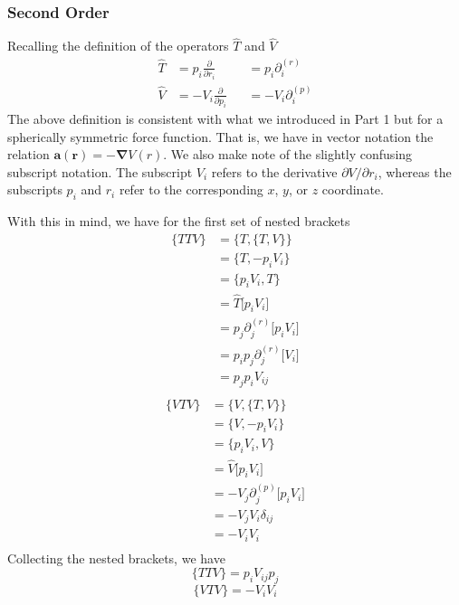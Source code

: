 \documentclass[8pt,a4paper]{article}
\begin{document}
	\subsubsection{Second Order}
	Recalling the definition of the operators $\hat{T}$ and $\hat{V}$
	\begin{align}
		\hat{T} &= p_i \frac{\partial}{\partial r_i}  &&= p_i\partial^{(r)}_i \\
		\hat{V} &= -V_i \frac{\partial}{\partial p_i} &&= -V_i\partial^{(p)}_i
	\end{align}
	The above definition is consistent with what we introduced in Part 1 but for a spherically symmetric force function. That is, we have in vector notation the relation $\mathbf{a}(\mathbf{r}) = - \mathbf{\nabla} V(r)$. We also make note of the slightly confusing subscript notation. The subscript $V_i$ refers to the derivative $\partial V/\partial r_i$, whereas the subscripts $p_i$ and $r_i$ refer to the corresponding $x$, $y$, or $z$ coordinate.
	
	With this in mind, we have for the first set of nested brackets
	\begin{align*}
		\{TTV\} &= \{T, \{T,V\}\} \\
		&= \{T, -p_iV_i\} \\
		&= \{p_i V_i, T\} \\
		&= \hat{T}\Big[p_i V_i\Big] \\
		&= p_j\partial^{(r)}_j\Big[p_i V_i\Big] \\
		&= p_i p_j\partial^{(r)}_j\Big[V_i\Big] \\
		&= p_j p_i V_{ij} \\
	\end{align*}
	\begin{align*}
		\{VTV\} &= \{V, \{T,V\}\} \\
		&= \{V, -p_iV_i\} \\
		&= \{p_i V_i, V\} \\
		&= \hat{V}\Big[p_i V_i\Big] \\
		&= -V_j\partial^{(p)}_j\Big[p_i V_i\Big] \\
		&= -V_j V_i \delta_{ij} \\
		&= -V_iV_i \\
	\end{align*}
	Collecting the nested brackets, we have
	\begin{equation}
		\boxed{	\{TTV\} = p_i V_{ij} p_j}
	\end{equation}
	\begin{equation}
		\boxed{	\{VTV\} = -V_iV_i }
	\end{equation}
	
\end{document}
